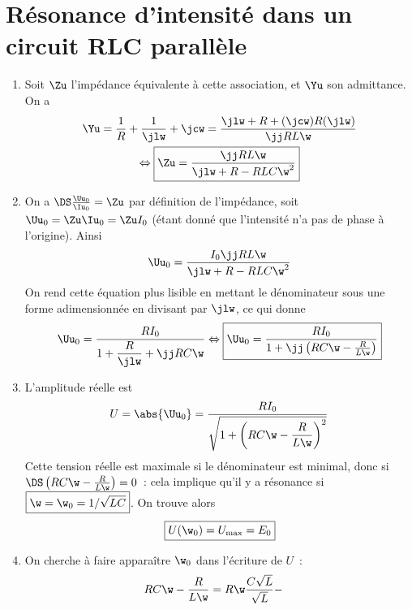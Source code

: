 \documentclass[a4paper, 12pt, final, garamond]{book}
\begin{document}
\section{Résonance d'intensité dans un circuit RLC parallèle}
\begin{enumerate}
    \item Soit $\Zu$ l'impédance équivalente à cette association, et $\Yu$ son
        admittance. On a
        \begin{gather*}
            \Yu = \frac{1}{R} + \frac{1}{\jlw} + \jcw
                = \frac{\jlw + R + (\jcw)R(\jlw)}{\jj RL\w}\\
            \Leftrightarrow
            \boxed{\Zu = \frac{\jj RL\w}{\jlw + R - RLC\w^2}}
        \end{gather*}
    \item On a $\DS \frac{\Uu_0}{\Iu_0} = \Zu$ par définition de l'impédance,
        soit $\Uu_0 = \Zu\Iu_0 = \Zu I_0$ (étant donné que l'intensité n'a pas
        de phase à l'origine). Ainsi
        \begin{gather*}
            \Uu_0 = \frac{I_0\jj RL\w}{\jlw + R - RLC\w^2}
        \end{gather*}
        On rend cette équation plus lisible en mettant le dénominateur sous une
        forme adimensionnée en divisant par $\jlw$, ce qui donne
        \begin{gather*}
            \Uu_0 = \frac{RI_0}{1 + \dfrac{R}{\jlw} + \jj RC\w}
            \Leftrightarrow
            \boxed{\Uu_0 = \frac{RI_0}{1 + \jj \left( RC\w - \frac{R}{L\w} \right)}}
        \end{gather*}
    \item L'amplitude réelle est
        \begin{gather*}
            U = \abs{\Uu_0} = \frac{RI_0}{\sqrt{1 + \left( RC\w - \dfrac{R}{L\w}
            \right)^2}}
        \end{gather*}
        Cette tension réelle est maximale si le dénominateur est minimal, donc
        si $\DS \left( RC\w - \frac{R}{L\w} \right) = 0$~: cela implique qu'il y
        a résonance si $\boxed{\w = \w_0 = 1/\sqrt{LC}}$. On trouve alors
        \begin{gather*}
            \boxed{U(\w_0) = U_{\max} = E_0}
        \end{gather*}
    \item On cherche à faire apparaître $\w_0$ dans l'écriture de $U$~:
        \begin{align*}
            RC\w - \frac{R}{L\w}
                & = R\w \frac{C\sqrt{L}}{\sqrt{L}} -

\end{align*}
\end{enumerate}
\end{document}
